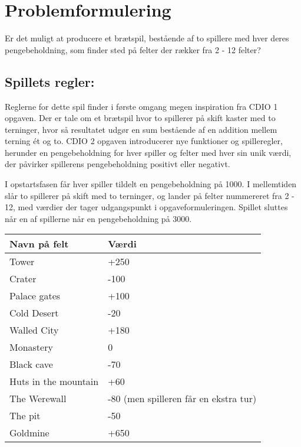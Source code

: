 \chapter{Problemformulering}
Er det muligt at producere et brætspil, bestående af to spillere med hver deres pengebeholdning, som finder sted på felter der rækker fra 2 - 12 felter?

\section*{Spillets regler:}

Reglerne for dette spil finder i første omgang megen inspiration fra CDIO 1 opgaven.
Der er tale om et brætspil hvor to spillerer på skift kaster med to terninger, hvor så resultatet udgør en sum bestående af en addition mellem terning ét og to.
CDIO 2 opgaven introducerer nye funktioner og spilleregler, herunder en pengebeholdning for hver spiller og felter med hver sin unik værdi, der påvirker spillerens pengebeholdning positivt eller negativt.

\vspace{5mm}

I opstartsfasen får hver spiller tildelt en pengebeholdning på 1000.
I mellemtiden slår to spillerer på skift med to terninger, og lander på felter nummereret fra 2 - 12, med værdier der tager udgangspunkt i opgaveformuleringen.
Spillet sluttes når en af spillerne når en pengebeholdning på 3000.

\vspace{5mm}

\begin{tabular}{ | l | p{9cm} |}
    \hline
    \textbf{Navn på felt} & \textbf{Værdi} \\ \hline
    Tower & +250 \\ \hline
    Crater & -100 \\ \hline
    Palace gates & +100 \\ \hline
    Cold Desert & -20 \\ \hline
    Walled City & +180 \\ \hline
    Monastery & 0 \\ \hline
    Black cave & -70 \\ \hline
    Huts in the mountain & +60 \\ \hline
    The Werewall & -80 (men spilleren får en ekstra tur) \\ \hline
    The pit & -50 \\ \hline
    Goldmine & +650 \\ \hline
    \hline
    \end{tabular}